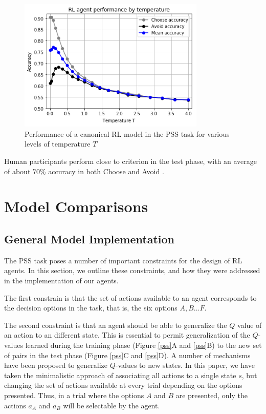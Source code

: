 \documentclass[10pt,letterpaper]{article}
\begin{document}
\begin{figure}[ht]
	\begin{center}
		\includegraphics[width=3.5in]{rl-performance.png}
	\end{center}
	\caption{Performance of a canonical RL model in the PSS task for various levels of temperature $T$} 
	\label{RL-agent-performance}
\end{figure}

Human participants perform close to criterion in the test phase, with an average of about 70\% accuracy in both Choose and Avoid \cite{frank2004carrot, frank2007genetic, stocco2017individual}.

\section{Model Comparisons}

\subsection{General Model Implementation}

The PSS task poses a number of important constraints for the design of RL agents. In this section, we outline these constraints, and how they were addressed in the implementation of our agents. 

The first constrain is that the set of actions available to an agent corresponds to the decision options in the task, that is, the six options $A, B \dots F$. 

The second constraint is that an agent should be able to generalize the $Q$ value of an action to an different state. This is essential to permit generalization of the $Q$-values learned during the training phase (Figure \ref{pss}A and \ref{pss}B) to the new set of pairs in the test phase (Figure \ref{pss}C and \ref{pss}D). A number of mechanisms have been proposed to generalize $Q$-values to new states. In this paper, we have taken the minimalistic approach of associating all actions to a single state $s$, but changing the set of actions available at every trial depending on the options presented. Thus, in a trial where the options $A$ and $B$ are presented, only the actions $a_A$ and $a_B$ will be selectable by the agent.
\end{document}
